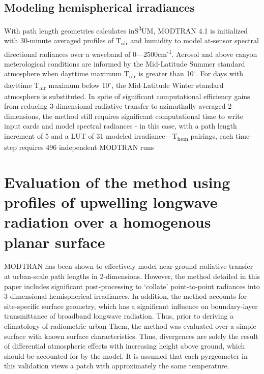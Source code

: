 \subsection{Modeling hemispherical irradiances}
With path length geometries calculates inS\textsuperscript{3}UM, MODTRAN 4.1 is initialized with 30-minute averaged profiles of T\textsubscript{air} and humidity to model at-sensor spectral directional radiances over a waveband of 0---2500cm\textsuperscript{-1}. Aerosol and above canyon meterological conditions are informed by the Mid-Latitude Summer standard atmosphere when dayttime maximum T\textsubscript{air} is greater than 10$^{\circ}$. For days with dayttime T\textsubscript{air} maximum below 10$^{\circ}$, the Mid-Latitude Winter standard atmosphere is substituted. In spite of significant computational efficiency gains from reducing 3-dimensional radiative transfer to azimuthally averaged 2-dimensions, the method still requires significant computational time to write input cards and model spectral radiances - in this case, with a path length increment of 5 and a LUT of 31 modeled irradiance---T\textsubscript{hem} pairings, each time-step requires 496 independent MODTRAN runs 




\section{Evaluation of the method using profiles of upwelling longwave radiation over a homogenous planar surface}

MODTRAN has been shown to effectively model near-ground radiative transfer at urban-scale path lengths in 2-dimensions. However, the method detailed in this paper includes significant post-processing to ‘collate’ point-to-point radiances into 3-dimensional hemispherical irradiances. In addition, the method accounts for site-specific surface geometry, which has a significant influence on boundary-layer transmittance of broadband longwave radiation. Thus, prior to deriving a climatology of radiometric urban Them, the method was evaluated over a simple surface with known surface characteristics. Thus, divergences are solely the result of differential atmospheric effects with increasing height above ground, which should be accounted for by the model. It is assumed that each pyrgeometer in this validation views a patch with approximately the same temperature. 

